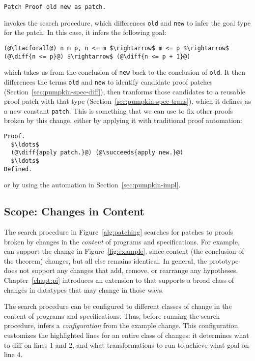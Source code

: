 \begin{lstlisting}
Patch Proof old new as patch.
\end{lstlisting}
\sysname invokes the search procedure, which differences \lstinline{old} and \lstinline{new} to infer the goal type for the patch.
In this case, it infers the following goal:

\begin{lstlisting}[language=coq]
  (@\ltacforall@) n m p, n <= m $\rightarrow$ m <= p $\rightarrow$ (@\diff{n <= p}@) $\rightarrow$ (@\diff{n <= p + 1}@)
\end{lstlisting}
which takes us from the conclusion of \lstinline{new} back to the conclusion of \lstinline{old}.
It then differences the terms \lstinline{old} and \lstinline{new} to identify candidate proof patches (Section~\ref{sec:pumpkin-spec-diff}),
then tranforms those candidates to a reusable proof patch with that type (Section~\ref{sec:pumpkin-spec-trans}),
which it defines as a new constant \lstinline{patch}.
This is something that we can use to fix other proofs broken by this change, either by applying it with traditional proof automation:

\begin{lstlisting}[language=coq]
Proof.
  $\ldots$
  (@\diff{apply patch.}@) (@\succeeds{apply new.}@)
  $\ldots$
Defined.
\end{lstlisting}
or by using the automation in Section~\ref{sec:pumpkin-impl}.

\subsection{Scope: Changes in Content}
\label{sec:pumpkin-scope}

The search procedure in Figure~\ref{alg:patching} searches for patches to proofs broken by changes in the \textit{content} of programs and specifications.
For example, \sysname can support the change in Figure~\ref{fig:example}, since content (the conclusion of the theorem) changes,
but all else remains identical.
In general, the \sysname prototype does not support any changes that add, remove, or rearrange any hypotheses.
Chapter~\ref{chapt:pi} introduces an extension to \sysname that supports a broad class of
changes in datatypes that may change in those ways.

The search procedure can be configured to different classes of change in the content of programs and specifications.
Thus, before running the search procedure, \sysname infers a \textit{configuration} from the example change.
This configuration customizes the highlighted lines for an entire class of changes:
it determines what to diff on lines 1 and 2,
and what transformations to run to achieve what goal on line 4.


